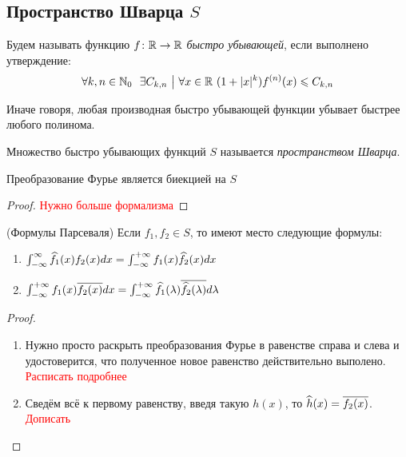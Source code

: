 \subsection{Пространство Шварца $S$}

\begin{definition}
	Будем называть функцию $f \colon \mathbb{R} \to \mathbb{R}$ \textit{быстро убывающей}, если выполнено утверждение:
	\[
		\forall k, n \in \mathbb{N}_0\ \ \exists C_{k, n} \ \big|\  \forall x \in \mathbb{R}\ (1 + |x|^k)f^{(n)}(x) \leqslant C_{k, n}
	\]
\end{definition}

\begin{anote}
	Иначе говоря, любая производная быстро убывающей функции убывает быстрее любого полинома.
\end{anote}

\begin{definition}
	Множество быстро убывающих функций $S$ называется \textit{пространством Шварца}.
\end{definition}

\begin{theorem}
	Преобразование Фурье является биекцией на $S$
\end{theorem}

\begin{proof}
	\textcolor{red}{Нужно больше формализма}
\end{proof}

\begin{theorem} (Формулы Парсеваля)
	Если $f_1, f_2 \in S$, то имеют место следующие формулы:
	\begin{enumerate}
		\item \(\int_{-\infty}^\infty \widehat{f}_1(x)f_2(x)dx = \int_{-\infty}^{+\infty} f_1(x)\widehat{f}_2(x)dx\)
		
		\item \(\int_{-\infty}^{+\infty} f_1(x)\overline{f_2(x)}dx = \int_{-\infty}^{+\infty} \widehat{f}_1(\lambda)\overline{\widehat{f}_2(\lambda)}d\lambda\)
	\end{enumerate}
\end{theorem}

\begin{proof}~
	\begin{enumerate}
		\item Нужно просто раскрыть преобразования Фурье в равенстве справа и слева и удостоверится, что полученное новое равенство действительно выполено. \textcolor{red}{Расписать подробнее}
		
		\item Сведём всё к первому равенству, введя такую $h(x)$, то $\widehat{h}(x) = \overline{f_2(x)}$. \textcolor{red}{Дописать}
	\end{enumerate}
\end{proof}